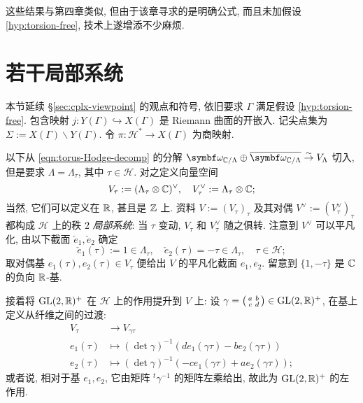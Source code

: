 这些结果与第四章类似, 但由于该章寻求的是明确公式, 而且未加假设 \ref{hyp:torsion-free}, 技术上遂增添不少麻烦.

\section{若干局部系统}\label{sec:Shimura-locsys} 
本节延续 \S\ref{sec:cplx-viewpoint} 的观点和符号, 依旧要求 $\Gamma$ 满足假设 \ref{hyp:torsion-free}. 包含映射 $j: Y(\Gamma) \hookrightarrow X(\Gamma)$ 是 Riemann 曲面的开嵌入. 记尖点集为 $\Sigma := X(\Gamma) \smallsetminus Y(\Gamma)$. 令 $\pi: \mathcal{H}^* \to X(\Gamma)$ 为商映射.

以下从 \eqref{eqn:torus-Hodge-decomp} 的分解 $\bomega_{\CC/\Lambda} \oplus \overline{\bomega_{\CC/\Lambda}} \rightiso V_\Lambda$ 切入, 但是要求 $\Lambda = \Lambda_\tau$, 其中 $\tau \in \mathcal{H}$. 对之定义向量空间
\[ V_\tau := (\Lambda_\tau \otimes \mathbb{C})^\vee, \quad V_\tau^\vee := \Lambda_\tau \otimes \mathbb{C}; \]
当然, 它们可以定义在 $\mathbb{R}$, 甚且是 $\mathbb{Z}$ 上. 资料 $V := (V_\tau)_\tau$ 及其对偶 $V^\vee := (V_\tau^\vee)_\tau$ 都构成 $\mathcal{H}$ 上的秩 $2$ \emph{局部系统}: 当 $\tau$ 变动, $V_\tau$ 和 $V_\tau^\vee$ 随之俱转. 注意到 $V^\vee$ 可以平凡化, 由以下截面 $\check{e}_1, \check{e}_2$ 确定
\[ \check{e}_1(\tau) := 1 \in \Lambda_\tau, \quad \check{e}_2(\tau) = -\tau \in \Lambda_\tau, \quad \tau \in \mathcal{H}; \]
取对偶基 $e_1(\tau), e_2(\tau) \in V_\tau$ 便给出 $V$ 的平凡化截面 $e_1, e_2$. 留意到 $\{ 1, -\tau \}$ 是 $\mathbb{C}$ 的负向 $\mathbb{R}$-基.

接着将 $\operatorname{GL}(2, \mathbb{R})^+$ 在 $\mathcal{H}$ 上的作用提升到 $V$ 上: 设 $\gamma = \bigl(\begin{smallmatrix} a & b \\ c & d \end{smallmatrix}\bigr) \in \operatorname{GL}(2, \mathbb{R})^+$, 在基上定义从纤维之间的过渡:
\begin{equation}\label{eqn:V-fiber-transport}\begin{aligned}
	V_\tau & \longrightarrow V_{\gamma\tau} \\
	e_1(\tau) & \mapsto (\det\gamma)^{-1} \left( d e_1(\gamma\tau) - b e_2(\gamma\tau) \right) \\
	e_2(\tau) & \mapsto (\det\gamma)^{-1} \left( -c e_1(\gamma\tau) + a e_2(\gamma\tau) \right);
\end{aligned}\end{equation}
或者说, 相对于基 $e_1, e_2$, 它由矩阵 ${}^t \gamma^{-1}$ 的矩阵左乘给出, 故此为 $\operatorname{GL}(2, \mathbb{R})^+$ 的左作用.


